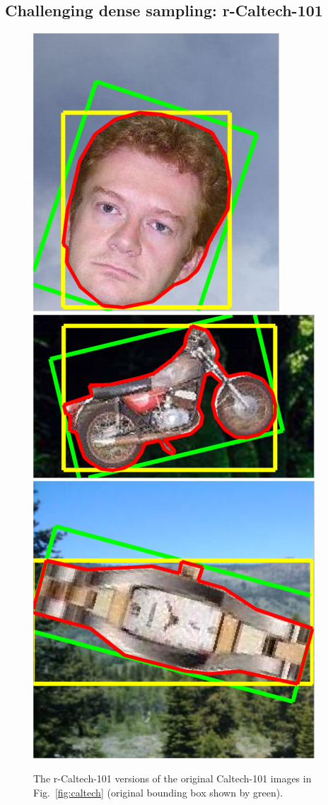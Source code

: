 \documentclass[review]{elsarticle}
\begin{document}
\subsection{Challenging dense sampling: r-Caltech-101\label{sec:challenging}}
%
\begin{figure}[h]
\begin{center}
  \includegraphics[width=0.2\linewidth]{resources/r-caltech-101_face_example.png}
  \includegraphics[width=0.4\linewidth]{resources/r-caltech-101_motorbikes_example.png}
  \includegraphics[width=0.2\linewidth]{resources/r-caltech-101_watch_example.png}
  \caption{The r-Caltech-101 versions of the original Caltech-101 images in Fig.~\ref{fig:caltech}
    (original bounding box shown by green).\label{fig:rcaltech}}
  \end{center}
\end{figure}
%
%
\end{document}
